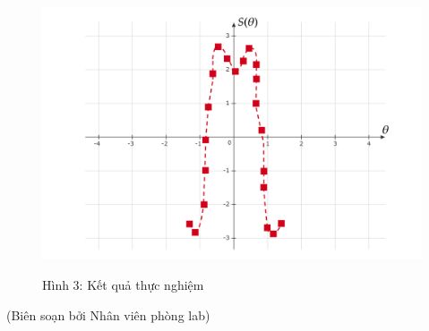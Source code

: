 \begin{enumerate}
\begin{enumerate}[label=\textbf{\alph*,}]
\begin{enumerate}
    \begin{center}
    \begin{figure}[htp]
    \begin{center}
        \includegraphics[scale=.22
        ]{Problem_15/image/3.png}
    \end{center}
    \begin{center}
    Hình 3: Kết quả thực nghiệm
    \end{center}
    \end{figure}
\end{center}
\end{enumerate}
\end{enumerate}

\end{enumerate}
\begin{flushright}
    (Biên soạn bởi Nhân viên phòng lab)
\end{flushright}